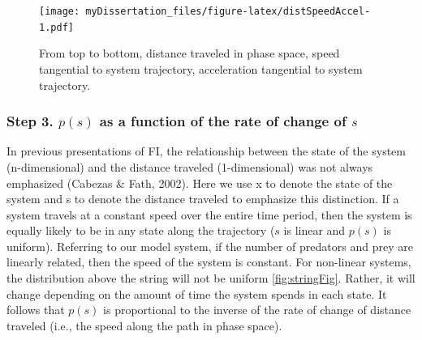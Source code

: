 \documentclass[12pt,twoside]{reedthesis}
\begin{document}
\begin{figure}
\centering
\texttt{[image: myDissertation\_files/figure-latex/distSpeedAccel-1.pdf]}
\caption{\label{fig:distSpeedAccel}From top to bottom, distance traveled in phase space, speed tangential to system trajectory, acceleration tangential to system trajectory.}
\end{figure}
\hypertarget{step-3.-ps-as-a-function-of-the-rate-of-change-of-s}{%
\subsubsection{\texorpdfstring{\textbf{Step 3.} \(p(s)\) as a function of the rate of change of \(s\)}{Step 3. p(s) as a function of the rate of change of s}}\label{step-3.-ps-as-a-function-of-the-rate-of-change-of-s}}

In previous presentations of FI, the relationship between the state of the system (n-dimensional) and the distance traveled (1-dimensional) was not always emphasized (Cabezas \& Fath, 2002). Here we use x to denote the state of the system and s to denote the distance traveled to emphasize this distinction. If a system travels at a constant speed over the entire time period, then the system is equally likely to be in any state along the trajectory (\(s\) is linear and \(p(s)\) is uniform). Referring to our model system, if the number of predators and prey are linearly related, then the speed of the system is constant. For non-linear systems, the distribution above the string will not be uniform \ref{fig:stringFig}. Rather, it will change depending on the amount of time the system spends in each state. It follows that \(p(s)\) is proportional to the inverse of the rate of change of distance traveled (i.e., the speed along the path in phase space).
\end{document}
